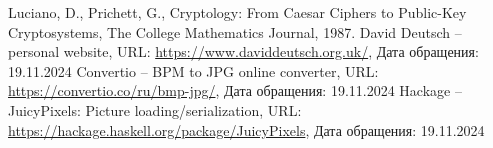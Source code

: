\documentclass[11pt,a4paper,final]{article} %
\begin{document}
\newpage
{} %

\vspace{-1.5cm}
\begin{thebibliography}{0}
	Luciano, D., Prichett, G., Cryptology: From Caesar Ciphers to Public-Key Cryptosystems, The College Mathematics Journal, 1987.
	David Deutsch -- personal website, URL: \url{https://www.daviddeutsch.org.uk/}, Дата обращения: 19.11.2024
	Convertio -- BPM to JPG online converter, URL: \url{https://convertio.co/ru/bmp-jpg/}, Дата обращения: 19.11.2024
	Hackage -- JuicyPixels: Picture loading/serialization, URL: \url{https://hackage.haskell.org/package/JuicyPixels}, Дата обращения: 19.11.2024
\end{thebibliography}



	
\end{document}
